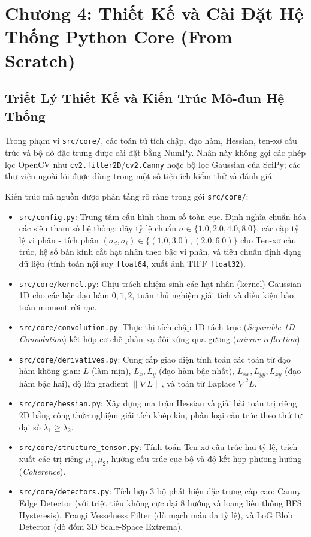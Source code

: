 \documentclass[conference]{IEEEtran}
\begin{document}


\section{Chương 4: Thiết Kế và Cài Đặt Hệ Thống Python Core (From Scratch)}

\subsection{Triết Lý Thiết Kế và Kiến Trúc Mô-đun Hệ Thống}
Trong phạm vi \texttt{src/core/}, các toán tử tích chập, đạo hàm, Hessian, ten-xơ cấu trúc và bộ dò đặc trưng được cài đặt bằng NumPy. Nhân này không gọi các phép lọc OpenCV như \texttt{cv2.filter2D}/\texttt{cv2.Canny} hoặc bộ lọc Gaussian của SciPy; các thư viện ngoài lõi được dùng trong một số tiện ích kiểm thử và đánh giá.

Kiến trúc mã nguồn được phân tầng rõ ràng trong gói \texttt{src/core/}:
\begin{itemize}
    \item \texttt{src/config.py}: Trung tâm cấu hình tham số toàn cục. Định nghĩa chuẩn hóa các siêu tham số hệ thống: dãy tỷ lệ chuẩn $\sigma \in \{1.0, 2.0, 4.0, 8.0\}$, các cặp tỷ lệ vi phân - tích phân $(\sigma_d, \sigma_i) \in \{(1.0, 3.0), (2.0, 6.0)\}$ cho Ten-xơ cấu trúc, hệ số bán kính cắt hạt nhân theo bậc vi phân, và tiêu chuẩn định dạng dữ liệu (tính toán nội suy \texttt{float64}, xuất ảnh TIFF \texttt{float32}).
    \item \texttt{src/core/kernel.py}: Chịu trách nhiệm sinh các hạt nhân (kernel) Gaussian 1D cho các bậc đạo hàm $0, 1, 2$, tuân thủ nghiệm giải tích và điều kiện bảo toàn moment rời rạc.
    \item \texttt{src/core/convolution.py}: Thực thi tích chập 1D tách trục (\textit{Separable 1D Convolution}) kết hợp cơ chế phản xạ đối xứng qua gương (\textit{mirror reflection}).
    \item \texttt{src/core/derivatives.py}: Cung cấp giao diện tính toán các toán tử đạo hàm không gian: $L$ (làm mịn), $L_x, L_y$ (đạo hàm bậc nhất), $L_{xx}, L_{yy}, L_{xy}$ (đạo hàm bậc hai), độ lớn gradient $\|\nabla L\|$, và toán tử Laplace $\nabla^2 L$.
    \item \texttt{src/core/hessian.py}: Xây dựng ma trận Hessian và giải bài toán trị riêng 2D bằng công thức nghiệm giải tích khép kín, phân loại cấu trúc theo thứ tự đại số $\lambda_1 \ge \lambda_2$.
    \item \texttt{src/core/structure\_tensor.py}: Tính toán Ten-xơ cấu trúc hai tỷ lệ, trích xuất các trị riêng $\mu_1, \mu_2$, hướng cấu trúc cục bộ và độ kết hợp phương hướng (\textit{Coherence}).
    \item \texttt{src/core/detectors.py}: Tích hợp 3 bộ phát hiện đặc trưng cấp cao: Canny Edge Detector (với triệt tiêu không cực đại 8 hướng và loang liên thông BFS Hysteresis), Frangi Vesselness Filter (dò mạch máu đa tỷ lệ), và LoG Blob Detector (dò đốm 3D Scale-Space Extrema).
\end{itemize}
\end{document}
